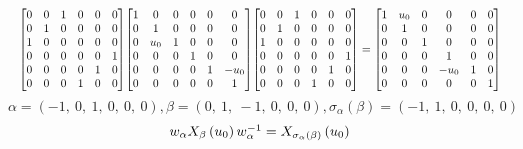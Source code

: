 \documentclass[11pt]{article}
\theoremstyle{definition}
\begin{document}
\[
\scaletoalign{\textwidth}{{\left[\begin{matrix}0 & 0 & 1 & 0 & 0 & 0\\0 & 1 & 0 & 0 & 0 & 0\\1 & 0 & 0 & 0 & 0 & 0\\0 & 0 & 0 & 0 & 0 & 1\\0 & 0 & 0 & 0 & 1 & 0\\0 & 0 & 0 & 1 & 0 & 0\end{matrix}\right]} {\left[\begin{matrix}1 & 0 & 0 & 0 & 0 & 0\\0 & 1 & 0 & 0 & 0 & 0\\0 & u_{0} & 1 & 0 & 0 & 0\\0 & 0 & 0 & 1 & 0 & 0\\0 & 0 & 0 & 0 & 1 & - u_{0}\\0 & 0 & 0 & 0 & 0 & 1\end{matrix}\right]} {\left[\begin{matrix}0 & 0 & 1 & 0 & 0 & 0\\0 & 1 & 0 & 0 & 0 & 0\\1 & 0 & 0 & 0 & 0 & 0\\0 & 0 & 0 & 0 & 0 & 1\\0 & 0 & 0 & 0 & 1 & 0\\0 & 0 & 0 & 1 & 0 & 0\end{matrix}\right]} = {\left[\begin{matrix}1 & u_{0} & 0 & 0 & 0 & 0\\0 & 1 & 0 & 0 & 0 & 0\\0 & 0 & 1 & 0 & 0 & 0\\0 & 0 & 0 & 1 & 0 & 0\\0 & 0 & 0 & - u_{0} & 1 & 0\\0 & 0 & 0 & 0 & 0 & 1\end{matrix}\right]}}
\]
\[
\alpha = \left( -1, \  0, \  1, \  0, \  0, \  0\right), \beta = \left( 0, \  1, \  -1, \  0, \  0, \  0\right), \sigma_{\alpha}(\beta) = \left( -1, \  1, \  0, \  0, \  0, \  0\right)
\]
\[
\scaletoalign{\textwidth}{w_{\alpha} X_{\beta}\left(u_{0}\right) w_{\alpha}^{-1} = X_{\sigma_{\alpha}\left(\beta\right)}\left(u_{0}\right)}
\]
\end{document}
